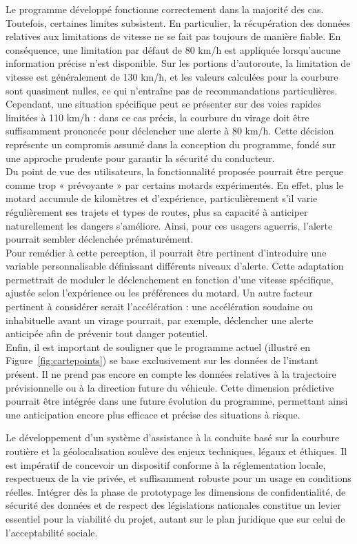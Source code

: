 \vspace{0.5cm}
Le programme développé fonctionne correctement dans la majorité des cas. Toutefois, certaines limites subsistent. En particulier, la récupération des données relatives aux limitations de vitesse ne se fait pas toujours de manière fiable. En conséquence, une limitation par défaut de 80 km/h est appliquée lorsqu’aucune information précise n’est disponible. Sur les portions d’autoroute, la limitation de vitesse est généralement de 130 km/h, et les valeurs calculées pour la courbure sont quasiment nulles, ce qui n’entraîne pas de recommandations particulières.\\
Cependant, une situation spécifique peut se présenter sur des voies rapides limitées à 110 km/h : dans ce cas précis, la courbure du virage doit être suffisamment prononcée pour déclencher une alerte à 80 km/h. Cette décision représente un compromis assumé dans la conception du programme, fondé sur une approche prudente pour garantir la sécurité du conducteur.\\
Du point de vue des utilisateurs, la fonctionnalité proposée pourrait être perçue comme trop « prévoyante » par certains motards expérimentés. En effet, plus le motard accumule de kilomètres et d'expérience, particulièrement s'il varie régulièrement ses trajets et types de routes, plus sa capacité à anticiper naturellement les dangers s'améliore. Ainsi, pour ces usagers aguerris, l'alerte pourrait sembler déclenchée prématurément.\\
Pour remédier à cette perception, il pourrait être pertinent d’introduire une variable personnalisable définissant différents niveaux d’alerte. Cette adaptation permettrait de moduler le déclenchement en fonction d’une vitesse spécifique, ajustée selon l’expérience ou les préférences du motard. Un autre facteur pertinent à considérer serait l'accélération : une accélération soudaine ou inhabituelle avant un virage pourrait, par exemple, déclencher une alerte anticipée afin de prévenir tout danger potentiel.\\
Enfin, il est important de souligner que le programme actuel (illustré en Figure~\ref{fig:cartepoints}) se base exclusivement sur les données de l’instant présent. Il ne prend pas encore en compte les données relatives à la trajectoire prévisionnelle ou à la direction future du véhicule. Cette dimension prédictive pourrait être intégrée dans une future évolution du programme, permettant ainsi une anticipation encore plus efficace et précise des situations à risque.

\vspace{0.5cm}
Le développement d’un système d’assistance à la conduite basé sur la courbure routière et la géolocalisation soulève des enjeux techniques, légaux et éthiques. Il est impératif de concevoir un dispositif conforme à la réglementation locale, respectueux de la vie privée, et suffisamment robuste pour un usage en conditions réelles. Intégrer dès la phase de prototypage les dimensions de confidentialité, de sécurité des données et de respect des législations nationales constitue un levier essentiel pour la viabilité du projet, autant sur le plan juridique que sur celui de l’acceptabilité sociale.


